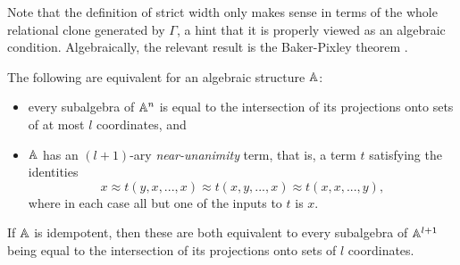 \documentclass[letterpaper,11pt]{article}
\begin{document}
Note that the definition of strict width only makes sense in terms of the whole relational clone generated by $\Gamma$, a hint that it is properly viewed as an algebraic condition. Algebraically, the relevant result is the Baker-Pixley theorem \cite{baker-pixley}.

\begin{thm} The following are equivalent for an algebraic structure $\mathbb{A}$:
\begin{itemize}
\item every subalgebra of $\mathbb{A}^n$ is equal to the intersection of its projections onto sets of at most $l$ coordinates, and

\item $\mathbb{A}$ has an $(l+1)$-ary \emph{near-unanimity} term, that is, a term $t$ satisfying the identities
\[
x \approx t(y,x,...,x) \approx t(x,y,...,x) \approx t(x,x,...,y),
\]
where in each case all but one of the inputs to $t$ is $x$.
\end{itemize}
If $\mathbb{A}$ is idempotent, then these are both equivalent to every subalgebra of $\mathbb{A}^{l+1}$ being equal to the intersection of its projections onto sets of $l$ coordinates.
\end{thm}
\end{document}
